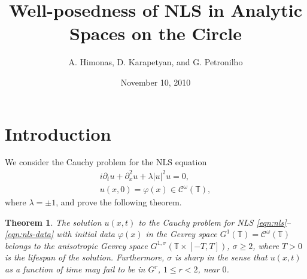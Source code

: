 \documentclass[12pt,reqno]{amsart}
\numberwithin{equation}{section}  %
\numberwithin{figure}{section}
\theoremstyle{plain}
\newtheorem{theorem}{Theorem}
\theoremstyle{definition}
\theoremstyle{remark}
\begin{document}
\title{Well-posedness of NLS in Analytic Spaces on the Circle}
\author{A. Himonas, D. Karapetyan, and G. Petronilho}
\date{November 10, 2010}
%
\maketitle
%
%
%
%
%
\section{Introduction}
\label{sec:introduction}
We consider the Cauchy problem for the NLS equation
%
\begin{gather}
  \label{eqn:nls}
  i\partial_tu+\partial_x^2u+\lambda |u|^2u=0,
  \\
  \label{eqn:nls-data}
  u(x,0)=\varphi(x) \in \mathcal{C}^\omega(\mathbb{T}),
\end{gather}
%
where $\lambda =\pm 1$, and prove the following theorem.
%
\begin{theorem}
  \label{thm:nls-analyt}
  The solution $u(x,t)$  to the Cauchy problem for NLS \eqref{eqn:nls}--
  \eqref{eqn:nls-data}  with   initial data $\varphi(x)$  in  the Gevrey space
  $G^1(\mathbb{T})=\mathcal{C}^\omega(\mathbb{T})$ belongs to the anisotropic
  Gevrey space $G^{1, \sigma}( \mathbb{T}\times [-T, T])$,  $\sigma \ge 2$, where
  $T>0$ is the lifespan of the solution. Furthermore, $\sigma$ is sharp in the
  sense that $u(x,t)$ as a function of  time  may fail to be in $G^r$, $1\le
  r<2$, near $0$.
\end{theorem}
%
%
%
%
%
%
%
%
%
%
\end{document}

